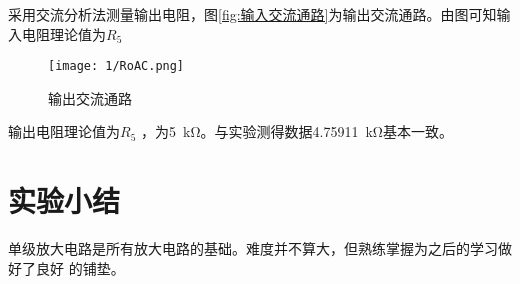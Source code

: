 采用交流分析法测量输出电阻，图\ref{fig:输入交流通路}为输出交流通路。由图可知输入电阻理论值为$ R_5 $

\begin{figure}[H]
	\centering
	\texttt{[image: 1/RoAC.png]}
	\caption{输出交流通路}
	\label{fig:输出交流通路}
\end{figure}

输出电阻理论值为$ R_5 $ ，为\SI{5}{\kohm}。与实验测得数据\SI{4.75911}{\kohm}基本一致。

\section{实验小结}%
\label{sec:\arabic{chapter}实验小结}

单级放大电路是所有放大电路的基础。难度并不算大，但熟练掌握为之后的学习做好了良好
的铺垫。

